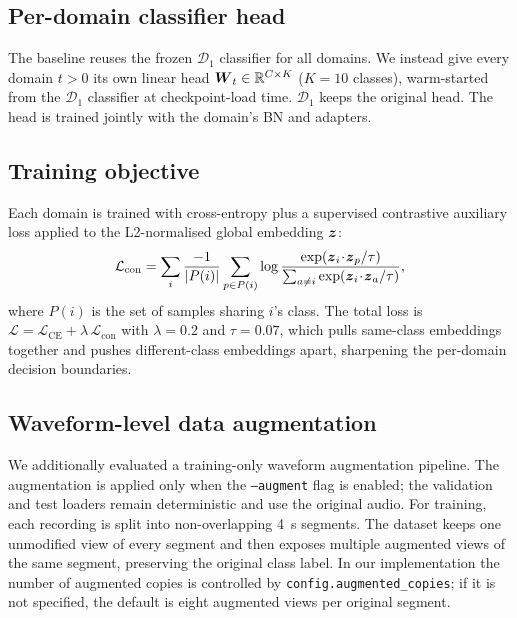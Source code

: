 \documentclass{article}
\newcommand{\symvec}[1]{{\mbox{\boldmath $#1$}}}
\begin{document}
\begin{sloppy}
\subsection{Per-domain classifier head}
\label{ssec:head}

The baseline reuses the frozen $\mathcal{D}_1$ classifier for all domains.
We instead give every domain $t>0$ its own linear head
$\symvec{W}_t\in\mathbb{R}^{C\times K}$ ($K=10$ classes), warm-started from
the $\mathcal{D}_1$ classifier at checkpoint-load time. $\mathcal{D}_1$ keeps
the original head. The head is trained jointly with the domain's BN and
adapters.

\subsection{Training objective}
\label{ssec:loss}

Each domain is trained with cross-entropy plus a supervised contrastive
auxiliary loss \cite{khosla2020supcon} applied to the L2-normalised global
embedding $\symvec{z}$:
\begin{equation}
  \label{eqn:supcon}
  \mathcal{L}_{\mathrm{con}} =
    \sum_{i}\frac{-1}{|P(i)|}\sum_{p\in P(i)}
      \log\frac{\exp(\symvec{z}_i\!\cdot\!\symvec{z}_p/\tau)}
               {\sum_{a\neq i}\exp(\symvec{z}_i\!\cdot\!\symvec{z}_a/\tau)},
\end{equation}
where $P(i)$ is the set of samples sharing $i$'s class. The total loss is
$\mathcal{L} = \mathcal{L}_{\mathrm{CE}} +
\lambda\,\mathcal{L}_{\mathrm{con}}$ with $\lambda=0.2$ and $\tau=0.07$,
which pulls same-class embeddings together and pushes different-class
embeddings apart, sharpening the per-domain decision boundaries.

\subsection{Waveform-level data augmentation}
\label{ssec:data_aug}
We additionally evaluated a training-only waveform augmentation pipeline.  The
augmentation is applied only when the \texttt{--augment} flag is enabled; the
validation and test loaders remain deterministic and use the original audio.
For training, each recording is split into non-overlapping 4~s segments.  The
dataset keeps one unmodified view of every segment and then exposes multiple
augmented views of the same segment, preserving the original class label.  In
our implementation the number of augmented copies is controlled by
\texttt{config.augmented\_copies}; if it is not specified, the default is eight
augmented views per original segment.


\end{sloppy}
\end{document}
